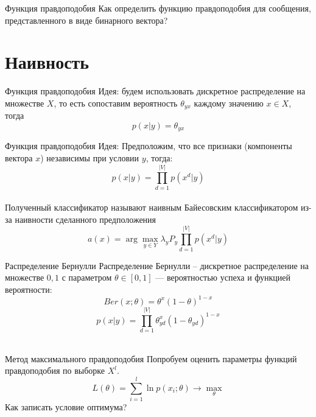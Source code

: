 \documentclass[10pt]{beamer}
\begin{document}
\begin{frame}{Функция правдоподобия}
  \centering 
  Как определить функцию правдоподобия для сообщения, представленного в виде бинарного вектора?
\end{frame}

\section{Наивность}

\begin{frame} {Функция правдоподобия}
  \alert{Идея}: будем использовать дискретное распределение на множестве $X$, то есть сопоставим вероятность $\theta_{yx}$ каждому
значению $x \in X$, тогда\\
$$p(x|y) = \theta_{yx}$$
\end{frame}

\begin{frame} {Функция правдоподобия}
  \alert{Идея}: Предположим, что все признаки (компоненты вектора $x$) независимы \alert{при условии} $y$, тогда:\\
  $$p(x|y) = \prod\limits_{d=1}^{|V|} p(x^d | y)$$\\
  \pause
  \bigbreak
  Полученный классификатор называют \alert{наивным} Байесовским классификатором из-за наивности сделанного предположения\\
  $$a(x) = \arg\max_{y \in Y} \lambda_y P_y \prod\limits_{d=1}^{|V|} p(x^d | y)$$
\end{frame}

{
\begin{frame} {Распределение Бернулли}
  Распределение Бернулли -- дискретное распределение на множестве ${0, 1}$ с параметром $\theta \in [0, 1]$ — вероятностью \alert{успеха} и функцией вероятности:\\
  $$Ber(x; \theta) = \theta^x (1 - \theta)^{1-x}$$
  \bigbreak
  \pause
  $$p(x|y) = \prod\limits_{d=1}^{|V|} \theta_{yd}^x (1 - \theta_{yd})^{1-x}$$\\

\end{frame}
}

{
\begin{frame}{Метод максимального правдоподобия}
  Попробуем оценить параметры функций правдоподобия по выборке $X^l$.\\
  $$L(\theta) = \sum\limits_{i=1}^{l} \ln p(x_i;\theta) \rightarrow \max\limits_{\theta}$$
  Как записать условие оптимума?
\end{frame}
}
\end{document}

